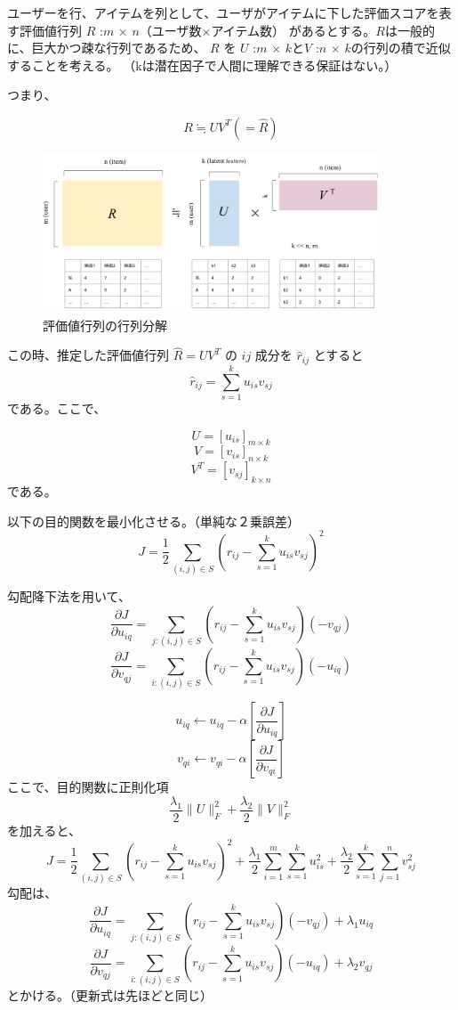 \documentclass{jarticle}
\begin{document}
ユーザーを行、アイテムを列として、ユーザがアイテムに下した評価スコアを表す評価値行列 $R$ :$m$ $\times$ $n$（ユーザ数×アイテム数） があるとする。$R$は一般的に、巨大かつ疎な行列であるため、 $R$ を $U$ :$m$ $\times$ $k$と$V$ :$n$ $\times$ $k$の行列の積で近似することを考える。
（kは潜在因子で人間に理解できる保証はない。）


つまり、

\[
 R \fallingdotseq U V^T (= \hat{R})
\]

\begin{figure}[htbp]
  \begin{center}
  \includegraphics[width=100mm]{matrix_factorization.png}
  \caption{評価値行列の行列分解}
  \end{center}
  \end{figure}
  

この時、推定した評価値行列 $\hat{R} = UV^T$  の $ij$ 成分を $\hat{r}_{ij}$ とすると
\[
 \hat{r}_{ij} =  \sum_{s=1}^{k} u_{is} v_{sj} 
\]
である。ここで、

\[
  U = [u_{is}]_{m \times k}
\]
\[
  V = [v_{is}]_{n \times k}
\]
\[
  V^T = [v_{sj}]_{k \times n}
\]
である。


以下の目的関数を最小化させる。（単純な２乗誤差）
\[
  J = \frac{1}{2} \sum_{(i,j) \in S} (r_{ij} - \sum_{s=1}^{k} u_{is} v_{sj} )^2
\]

勾配降下法を用いて、
\[
\frac{\partial J}{\partial u_{iq}} = \sum_{j:(i,j) \in S} (r_{ij} - \sum_{s=1}^{k} u_{is} v_{sj} )(-v_{qj}) 
\]
\[
\frac{\partial J}{\partial v_{qj}} = \sum_{i:(i,j) \in S} (r_{ij} - \sum_{s=1}^{k} u_{is} v_{sj} )(-u_{iq}) 
\]

\[
  u_{iq} \longleftarrow u_{iq} - \alpha\left[\frac{\partial J}{\partial u_{iq}}\right]
\]
\[
  v_{qi} \longleftarrow v_{qi} - \alpha\left[\frac{\partial J}{\partial v_{qi}}\right]
\]
ここで、目的関数に正則化項 
\[
  \frac{\lambda_1}{2}\|U\|^2_F + \frac{\lambda_2}{2}\|V\|^2_F
\]
を加えると、
\[
  J = \frac{1}{2} \sum_{(i,j) \in S} (r_{ij} - \sum_{s=1}^{k} u_{is} v_{sj} )^2 + \frac{\lambda_1}{2}\sum_{i=1}^{m}\sum_{s=1}^{k}u_{is}^2 + \frac{\lambda_2}{2}\sum_{s=1}^{k}\sum_{j=1}^{n}v_{sj}^2
\]
勾配は、
\[
\frac{\partial J}{\partial u_{iq}} = \sum_{j:(i,j) \in S} (r_{ij} - \sum_{s=1}^{k} u_{is} v_{sj} )(-v_{qj}) + \lambda_1 u_{iq}
\]
\[
\frac{\partial J}{\partial v_{qj}} = \sum_{i:(i,j) \in S} (r_{ij} - \sum_{s=1}^{k} u_{is} v_{sj} )(-u_{iq}) + \lambda_2 v_{qj}
\]
とかける。（更新式は先ほどと同じ）
\end{document}
